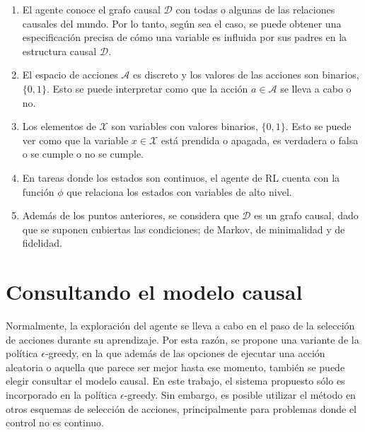 \begin{enumerate}
    \item El agente conoce el grafo causal $\mathcal{D}$ con todas o
    algunas de las relaciones causales del mundo.
    Por lo tanto, según sea el caso, se puede obtener una especificación precisa de cómo una variable es influida por sus padres en la estructura causal $\mathcal{D}$.
    \item El espacio de acciones $\mathcal{A}$ es discreto y los valores de las acciones son binarios, $\{0, 1\}$. Esto se puede interpretar como que la acción $a \in \mathcal{A}$ se lleva a cabo o no.
    \item Los elementos de $\mathcal{X}$ son variables con valores binarios, $\{0,1\}$. Esto se puede ver como que la variable $x\in \mathcal{X}$
    está prendida o apagada, es verdadera o falsa o se cumple o no se cumple.
    \item En tareas donde los estados son continuos, el agente de RL cuenta con la función $\phi$ que relaciona los estados con variables de alto nivel.
    \item Además de los puntos anteriores, se considera que $\mathcal{D}$ es un grafo causal, dado que
    se suponen cubiertas las condiciones; de Markov, de minimalidad y
    de fidelidad.
\end{enumerate}


\section{Consultando el modelo causal}

Normalmente, la exploración del agente se lleva a cabo en el paso de la selección de acciones
durante su aprendizaje. Por esta razón,
se propone una variante de la política $\epsilon$-greedy, en la que además de las opciones de ejecutar
una acción aleatoria o aquella que parece ser mejor hasta ese momento, también se puede elegir consultar el modelo causal.  En este trabajo,  el sistema propuesto sólo es incorporado en la política $\epsilon$-greedy. Sin embargo, es posible utilizar el método en otros esquemas de selección de acciones, principalmente para problemas donde el control no es continuo.

